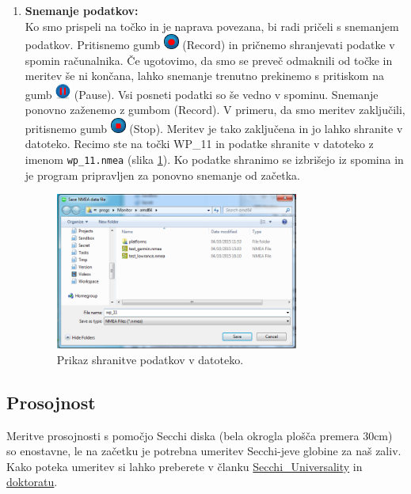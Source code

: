 \begin{enumerate}
	\item \textbf{Snemanje podatkov:}\\[1mm]
	Ko smo prispeli na točko in je naprava povezana, bi radi pričeli s snemanjem podatkov. Pritisnemo gumb \includegraphics[width=5mm]{Vaje/KartGlobSlan/figs/icons/record.png} (Record) in pričnemo shranjevati podatke v spomin računalnika. Če ugotovimo, da smo se preveč odmaknili od točke in meritev še ni končana, lahko snemanje trenutno prekinemo s pritiskom na gumb \includegraphics[width=5mm]{Vaje/KartGlobSlan/figs/icons/pause.png} (Pause). Vsi posneti podatki so še vedno v spominu. Snemanje ponovno zaženemo z gumbom (Record). V primeru, da smo meritev zaključili, pritisnemo gumb \includegraphics[width=5mm]{Vaje/KartGlobSlan/figs/icons/stop.png} (Stop). Meritev je tako zaključena in jo lahko shranite v datoteko. Recimo ste na točki WP\_11 in podatke shranite v datoteko z imenom \texttt{wp\_11.nmea} (slika \ref{fig:v_est_lmp_03}). Ko podatke shranimo se izbrišejo iz spomina in je program pripravljen za ponovno snemanje od začetka.\\[2mm]
	
	\begin{figure}[!h]
		\centering \includegraphics[width=8cm]{Vaje/KartGlobSlan/figs/save.png}
		\caption{Prikaz shranitve podatkov v datoteko.}
		\label{fig:v_est_lmp_03}
	\end{figure}
	
\end{enumerate}


\subsection{Prosojnost}
Meritve prosojnosti s pomočjo Secchi diska (bela okrogla plošča premera 30cm) so enostavne, le na začetku je potrebna umeritev Secchi-jeve globine za naš zaliv. Kako poteka umeritev si lahko preberete v članku \href{https://drive.google.com/open?id=0B1dT-CBA07ANSFBneFpLSXV1SjQ}{Secchi\_Universality} in \href{https://drive.google.com/open?id=0B1dT-CBA07ANbmRIQkZieUhGYVE}{doktoratu}.\\[5mm]

